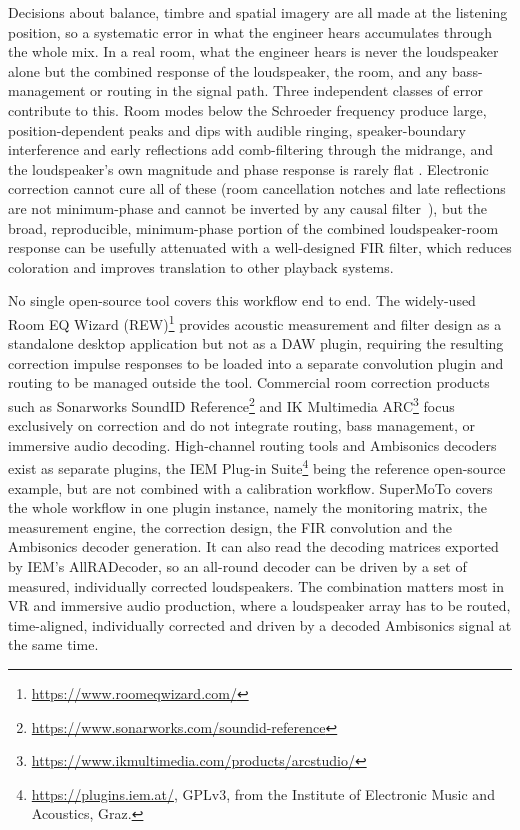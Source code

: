 \documentclass[10pt,a4paper]{article}
\begin{document}
Decisions about balance, timbre and spatial imagery are all made at the listening position, so a systematic error in what the engineer hears accumulates through the whole mix. In a real room, what the engineer hears is never the loudspeaker alone but the combined response of the loudspeaker, the room, and any bass-management or routing in the signal path. Three independent classes of error contribute to this. Room modes below the Schroeder frequency produce large, position-dependent peaks and dips with audible ringing, speaker-boundary interference and early reflections add comb-filtering through the midrange, and the loudspeaker's own magnitude and phase response is rarely flat \cite{Toole}. Electronic correction cannot cure all of these (room cancellation notches and late reflections are not minimum-phase and cannot be inverted by any causal filter~\cite{NeelyAllen}), but the broad, reproducible, minimum-phase portion of the combined loudspeaker-room response can be usefully attenuated with a well-designed FIR filter, which reduces coloration and improves translation to other playback systems.

No single open-source tool covers this workflow end to end. The widely-used Room EQ Wizard (REW)\footnote{\url{https://www.roomeqwizard.com/}} provides acoustic measurement and filter design as a standalone desktop application but not as a DAW plugin, requiring the resulting correction impulse responses to be loaded into a separate convolution plugin and routing to be managed outside the tool. Commercial room correction products such as Sonarworks SoundID Reference\footnote{\url{https://www.sonarworks.com/soundid-reference}} and IK Multimedia ARC\footnote{\url{https://www.ikmultimedia.com/products/arcstudio/}} focus exclusively on correction and do not integrate routing, bass management, or immersive audio decoding. High-channel routing tools and Ambisonics decoders exist as separate plugins, the IEM Plug-in Suite\footnote{\url{https://plugins.iem.at/}, GPLv3, from the Institute of Electronic Music and Acoustics, Graz.} being the reference open-source example, but are not combined with a calibration workflow. SuperMoTo covers the whole workflow in one plugin instance, namely the monitoring matrix, the measurement engine, the correction design, the FIR convolution and the Ambisonics decoder generation. It can also read the decoding matrices exported by IEM's AllRADecoder, so an all-round decoder can be driven by a set of measured, individually corrected loudspeakers. The combination matters most in VR and immersive audio production, where a loudspeaker array has to be routed, time-aligned, individually corrected and driven by a decoded Ambisonics signal at the same time.
\end{document}
